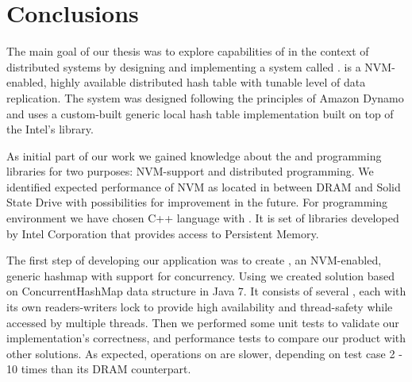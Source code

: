 \chapter{Conclusions} \label{Conclusion}


The main goal of our thesis was to explore capabilities of \NVM in the context of distributed systems by designing and implementing a system called \DHTS. \DHTS is a NVM-enabled, highly available distributed hash table with tunable level of data replication.
The system was designed following the principles of Amazon Dynamo and uses a custom-built generic local hash table implementation built on top of the Intel's \libpmemobj library.


As initial part of our work we gained knowledge about the \NVM and programming libraries for two purposes: NVM-support and distributed programming. 
We identified expected performance of NVM as located in between DRAM and Solid State Drive with possibilities for improvement in the future. 
For programming environment we have chosen C++ language with \PMDK. 
It is set of libraries developed by Intel Corporation that provides access to Persistent Memory.

The first step of developing our application was to create \PHT, an NVM-enabled, generic hashmap with support for concurrency.
Using \PMDK we created solution based on ConcurrentHashMap data structure in Java 7. 
It consists of several \internalHashMaps, each with its own readers-writers lock to provide high availability and thread-safety while accessed by multiple threads.
Then we performed some unit tests to validate our implementation's correctness, and performance tests to compare our product with other solutions.
As expected, operations on \PHT are slower, depending on test case 2 - 10 times than its DRAM counterpart.

